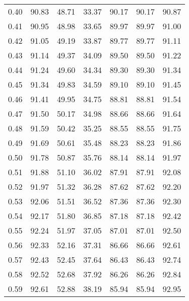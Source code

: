 \begin{tabular}{|c|c|c|c|c|c|c|}
      0.40 &     90.83 &     48.71 &      33.37 &   90.17 &      90.17 &         90.87 \\
      0.41 &     90.95 &     48.98 &      33.65 &   89.97 &      89.97 &         91.00 \\
      0.42 &     91.05 &     49.19 &      33.87 &   89.77 &      89.77 &         91.11 \\
      0.43 &     91.14 &     49.37 &      34.09 &   89.50 &      89.50 &         91.22 \\
      0.44 &     91.24 &     49.60 &      34.34 &   89.30 &      89.30 &         91.34 \\
      0.45 &     91.34 &     49.83 &      34.59 &   89.10 &      89.10 &         91.45 \\
      0.46 &     91.41 &     49.95 &      34.75 &   88.81 &      88.81 &         91.54 \\
      0.47 &     91.50 &     50.17 &      34.98 &   88.66 &      88.66 &         91.64 \\
      0.48 &     91.59 &     50.42 &      35.25 &   88.55 &      88.55 &         91.75 \\
      0.49 &     91.69 &     50.61 &      35.48 &   88.23 &      88.23 &         91.86 \\
      0.50 &     91.78 &     50.87 &      35.76 &   88.14 &      88.14 &         91.97 \\
      0.51 &     91.88 &     51.10 &      36.02 &   87.91 &      87.91 &         92.08 \\
      0.52 &     91.97 &     51.32 &      36.28 &   87.62 &      87.62 &         92.20 \\
      0.53 &     92.06 &     51.51 &      36.52 &   87.36 &      87.36 &         92.30 \\
      0.54 &     92.17 &     51.80 &      36.85 &   87.18 &      87.18 &         92.42 \\
      0.55 &     92.24 &     51.97 &      37.05 &   87.01 &      87.01 &         92.50 \\
      0.56 &     92.33 &     52.16 &      37.31 &   86.66 &      86.66 &         92.61 \\
      0.57 &     92.43 &     52.45 &      37.64 &   86.43 &      86.43 &         92.74 \\
      0.58 &     92.52 &     52.68 &      37.92 &   86.26 &      86.26 &         92.84 \\
      0.59 &     92.61 &     52.88 &      38.19 &   85.94 &      85.94 &         92.95 \\

\end{tabular}
